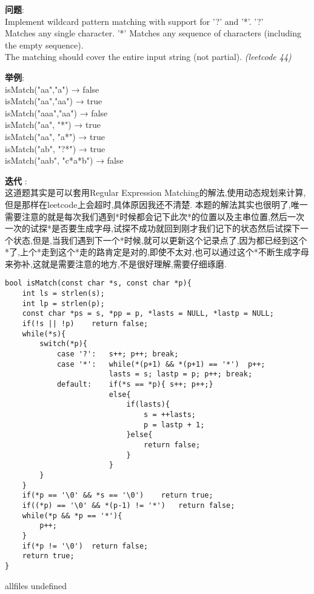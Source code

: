 \documentclass{article}
\begin{document}
\begin{CJK}{UTF8}{gbsn}     %

\else
    
\begin{description}
    \item{\textbf{问题}}:\\
	 Implement wildcard pattern matching with support for '?' and '*'. '?'\\
	 Matches any single character. '*' Matches any sequence of characters (including the empty sequence).\\
	 The matching should cover the entire input string (not partial). \textit{(leetcode 44)}
	\item{\textbf{举例}}: \\
	isMatch("aa","a") → false\\
	isMatch("aa","aa") → true\\
	isMatch("aaa","aa") → false\\
	isMatch("aa", "*") → true\\
	isMatch("aa", "a*") → true\\
	isMatch("ab", "?*") → true\\
	isMatch("aab", "c*a*b") → false\\
    \item{\textbf{迭代}} : 
    \\这道题其实是可以套用Regular Expression Matching的解法,使用动态规划来计算,但是那样在leetcode上会超时,具体原因我还不清楚. 本题的解法其实也很明了,唯一需要注意的就是每次我们遇到*时候都会记下此次*的位置以及主串位置,然后一次一次的试探*是否要生成字母,试探不成功就回到刚才我们记下的状态然后试探下一个状态,但是,当我们遇到下一个*时候,就可以更新这个记录点了,因为都已经到这个*了,上个*走到这个*走的路肯定是对的,即使不太对,也可以通过这个*不断生成字母来弥补,这就是需要注意的地方,不是很好理解,需要仔细琢磨.
    \begin{lstlisting}
bool isMatch(const char *s, const char *p){
	int ls = strlen(s);
	int lp = strlen(p);
	const char *ps = s, *pp = p, *lasts = NULL, *lastp = NULL;
	if(!s || !p)	return false;
	while(*s){
		switch(*p){
			case '?':	s++; p++; break;
			case '*':	while(*(p+1) && *(p+1) == '*')	p++;
						lasts = s; lastp = p; p++; break;
			default:	if(*s == *p){ s++; p++;}
						else{
							if(lasts){
								s = ++lasts;
								p = lastp + 1;
							}else{
								return false;
							}
						}
		}
	}
	if(*p == '\0' && *s == '\0')	return true;
	if((*p) == '\0' && *(p-1) != '*')	return false;
	while(*p && *p == '*'){
		p++;
	}
	if(*p != '\0')	return false;
	return true;
}
    \end{lstlisting}
\end{description}

\fi

\ifx allfiles undefined
\end{CJK}
\end{document}
